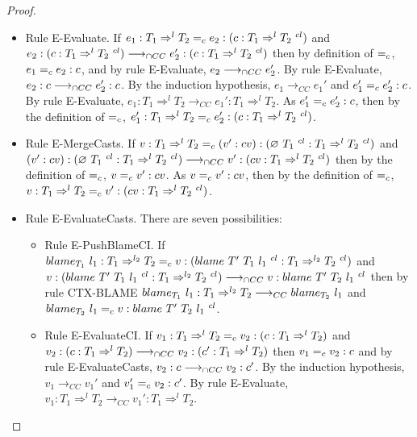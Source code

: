 \documentclass[a4paper]{article}
\begin{document}
\begin{proof}
\begin{itemize}
\begin{itemize}
        \item Rule E-Evaluate.
        If $e_1 : T_1 \Rightarrow^l T_2 \equalityCasts e_2 : (c : T_1 \Rightarrow^l T_2\ ^{cl})$ and $e_2 : (c : T_1 \Rightarrow^l T_2\ ^{cl}) \gios e_2' : (c : T_1 \Rightarrow^l T_2\ ^{cl})$ then by definition of $=_c$, $e_1 =_c e_2 : c$, and by rule E-Evaluate, $e_2 \longrightarrow_{\cap CC} e_2'$.
        By rule E-Evaluate, $e_2 : c \longrightarrow_{\cap CC} e_2' : c$.
        By the induction hypothesis, $e_1 \longrightarrow_{CC} e_1'$ and $e_1' =_c e_2' : c$.
        By rule E-Evaluate, $e_1 : T_1 \Rightarrow^l T_2 \longrightarrow_{CC} e_1' : T_1 \Rightarrow^l T_2$.
        As $e_1' =_c e_2' : c$, then by the definition of $=_c$, $e_1' : T_1 \Rightarrow^l T_2 =_c e_2' : (c : T_1 \Rightarrow^l T_2\ ^{cl})$.
        \item Rule E-MergeCasts.
        If $v : T_1 \Rightarrow^l T_2 =_c (v' : cv ) : (\varnothing\ T_1\ ^{cl} : T_1 \Rightarrow^l T_2\ ^{cl})$ and $(v' : cv ) : (\varnothing\ T_1\ ^{cl} : T_1 \Rightarrow^l T_2\ ^{cl}) \longrightarrow_{\cap CC} v' : (cv : T_1 \Rightarrow^l T_2\ ^{cl})$ then by the definition of $=_c$, $v =_c v' : cv$.
        As $v =_c v' : cv$, then by the definition of $=_c$, $v : T_1 \Rightarrow^l T_2 =_c v' : (cv : T_1 \Rightarrow^l T_2\ ^{cl})$.
        \item Rule E-EvaluateCasts.
        There are seven possibilities:
        \begin{itemize}
            \item Rule E-PushBlameCI.
            If $blame_{T_1}\ l_1 : T_1 \Rightarrow^{l_2} T_2 =_c v : (blame\ T'\ T_1\ l_1\ ^{cl} : T_1 \Rightarrow^{l_2} T_2\ ^{cl})$ and $v : (blame\ T'\ T_1\ l_1\ ^{cl} : T_1 \Rightarrow^{l_2} T_2\ ^{cl}) \longrightarrow_{\cap CC} v : blame\ T'\ T_2\ l_1\ ^{cl}$ then by rule CTX-BLAME $blame_{T_1}\ l_1 : T_1 \Rightarrow^{l_2} T_2 \longrightarrow_{CC} blame_{T_2}\ l_1$ and $blame_{T_2}\ l_1 =_c v : blame\ T'\ T_2\ l_1\ ^{cl}$.
            \item Rule E-EvaluateCI.
            If $v_1 : T_1 \Rightarrow^l T_2 =_c v_2 : (c : T_1 \Rightarrow^l T_2)$ and $v_2 : (c : T_1 \Rightarrow^l T_2) \longrightarrow_{\cap CC} v_2 : (c' : T_1 \Rightarrow^l T_2)$ then $v_1 =_c v_2 : c$ and by rule E-EvaluateCasts, $v_2 : c \longrightarrow_{\cap CC} v_2 : c'$.
            By the induction hypothesis, $v_1 \longrightarrow_{CC} v_1'$ and $v_1' =_c v_2 : c'$.
            By rule E-Evaluate, $v_1 : T_1 \Rightarrow^l T_2 \longrightarrow_{CC} v_1' : T_1 \Rightarrow^l T_2$.

\end{itemize}
\end{itemize}
\end{itemize}
\end{proof}
\end{document}

